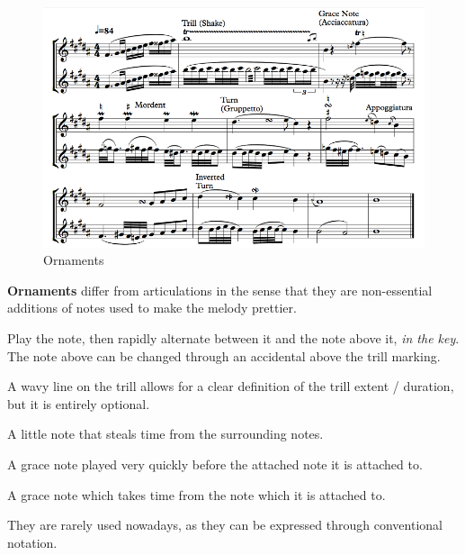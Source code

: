 \begin{figure}[h]
    \begin{center}
        \includegraphics[width=1\textwidth]{img/ornaments}
        \caption{Ornaments}
    \end{center}
\end{figure}

\textbf{Ornaments} differ from articulations in the sense that they are non-essential additions of notes used to make the melody prettier.

\begin{definition}[Trill]
    Play the note, then rapidly alternate between it and the note above it, \emph{in the key}. The note above can be changed through an accidental above the trill marking.
\end{definition}

A wavy line on the trill allows for a clear definition of the trill extent / duration, but it is entirely optional.

\begin{definition}
    A little note that steals time from the surrounding notes.
\end{definition}

\begin{definition}[Acciaccatura]
    A grace note played very quickly before the attached note it is attached to.
\end{definition}

\begin{definition}[Appoggiatura]
    A grace note which takes time from the note which it is attached to.

    They are rarely used nowadays, as they can be expressed through conventional notation.
\end{definition}

